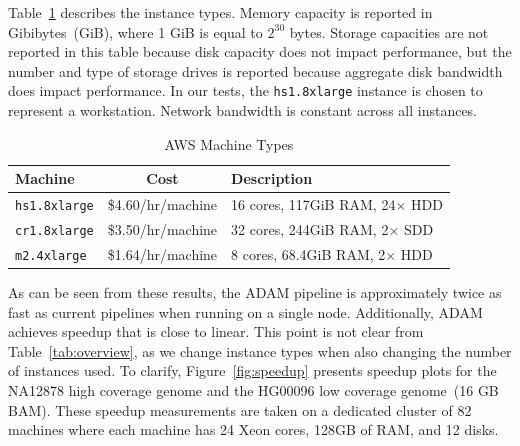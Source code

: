 \documentclass{acm_proc_article-sp}
\begin{document}
Table~\ref{tab:machines} describes the instance types. Memory capacity is reported in Gibibytes~(GiB),
where 1 GiB is equal to $2^{30}$ bytes. Storage capacities are not reported in this table because disk
capacity does not impact performance, but the number and type of storage drives is reported because
aggregate disk bandwidth does impact performance. In our tests, the \texttt{hs1.8xlarge} instance is
chosen to represent a workstation. Network bandwidth is constant across all instances.

\begin{table}[h]
\caption{AWS Machine Types}
\label{tab:machines}
\begin{tabular}{ l c l }
\hline
\bf Machine & \bf Cost & \bf Description \\
\hline
\hline
\texttt{hs1.8xlarge} & \$4.60/hr/machine & 16 cores, 117GiB RAM, 24$\times$ HDD \\
\texttt{cr1.8xlarge} & \$3.50/hr/machine & 32 cores, 244GiB RAM, 2$\times$ SDD \\
\texttt{m2.4xlarge} & \$1.64/hr/machine & 8 cores, 68.4GiB RAM, 2$\times$ HDD \\
\hline
\end{tabular}
\end{table}

As can be seen from these results, the ADAM pipeline is approximately twice as fast as current pipelines
when running on a single node. Additionally, ADAM achieves speedup that is close to linear. This point is
not clear from Table~\ref{tab:overview}, as we change instance types when also changing the number of
instances used. To clarify, Figure~\ref{fig:speedup} presents speedup plots for the NA12878 high
coverage genome and the HG00096 low coverage genome~(16 GB BAM). These speedup
measurements are taken on a dedicated cluster of 82 machines where each machine has 24 Xeon
cores, 128GB of RAM, and 12 disks.
\end{document}
